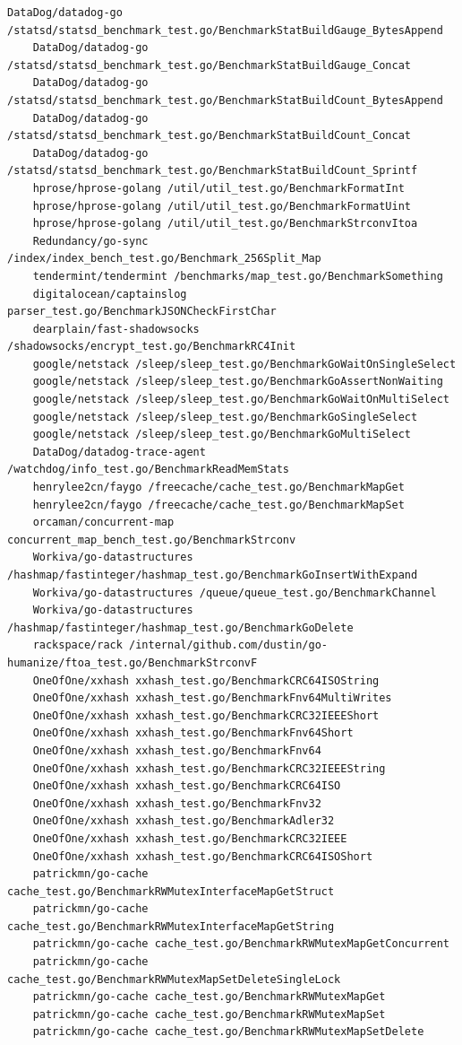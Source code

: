 \documentclass{seal_thesis}
\begin{document}
\begin{lstlisting}[basicstyle=\tiny]
	DataDog/datadog-go /statsd/statsd_benchmark_test.go/BenchmarkStatBuildGauge_BytesAppend
	DataDog/datadog-go /statsd/statsd_benchmark_test.go/BenchmarkStatBuildGauge_Concat
	DataDog/datadog-go /statsd/statsd_benchmark_test.go/BenchmarkStatBuildCount_BytesAppend
	DataDog/datadog-go /statsd/statsd_benchmark_test.go/BenchmarkStatBuildCount_Concat
	DataDog/datadog-go /statsd/statsd_benchmark_test.go/BenchmarkStatBuildCount_Sprintf
	hprose/hprose-golang /util/util_test.go/BenchmarkFormatInt
	hprose/hprose-golang /util/util_test.go/BenchmarkFormatUint
	hprose/hprose-golang /util/util_test.go/BenchmarkStrconvItoa
	Redundancy/go-sync /index/index_bench_test.go/Benchmark_256Split_Map
	tendermint/tendermint /benchmarks/map_test.go/BenchmarkSomething
	digitalocean/captainslog parser_test.go/BenchmarkJSONCheckFirstChar
	dearplain/fast-shadowsocks /shadowsocks/encrypt_test.go/BenchmarkRC4Init
	google/netstack /sleep/sleep_test.go/BenchmarkGoWaitOnSingleSelect
	google/netstack /sleep/sleep_test.go/BenchmarkGoAssertNonWaiting
	google/netstack /sleep/sleep_test.go/BenchmarkGoWaitOnMultiSelect
	google/netstack /sleep/sleep_test.go/BenchmarkGoSingleSelect
	google/netstack /sleep/sleep_test.go/BenchmarkGoMultiSelect
	DataDog/datadog-trace-agent /watchdog/info_test.go/BenchmarkReadMemStats
	henrylee2cn/faygo /freecache/cache_test.go/BenchmarkMapGet
	henrylee2cn/faygo /freecache/cache_test.go/BenchmarkMapSet
	orcaman/concurrent-map concurrent_map_bench_test.go/BenchmarkStrconv
	Workiva/go-datastructures /hashmap/fastinteger/hashmap_test.go/BenchmarkGoInsertWithExpand
	Workiva/go-datastructures /queue/queue_test.go/BenchmarkChannel
	Workiva/go-datastructures /hashmap/fastinteger/hashmap_test.go/BenchmarkGoDelete
	rackspace/rack /internal/github.com/dustin/go-humanize/ftoa_test.go/BenchmarkStrconvF
	OneOfOne/xxhash xxhash_test.go/BenchmarkCRC64ISOString
	OneOfOne/xxhash xxhash_test.go/BenchmarkFnv64MultiWrites
	OneOfOne/xxhash xxhash_test.go/BenchmarkCRC32IEEEShort
	OneOfOne/xxhash xxhash_test.go/BenchmarkFnv64Short
	OneOfOne/xxhash xxhash_test.go/BenchmarkFnv64
	OneOfOne/xxhash xxhash_test.go/BenchmarkCRC32IEEEString
	OneOfOne/xxhash xxhash_test.go/BenchmarkCRC64ISO
	OneOfOne/xxhash xxhash_test.go/BenchmarkFnv32
	OneOfOne/xxhash xxhash_test.go/BenchmarkAdler32
	OneOfOne/xxhash xxhash_test.go/BenchmarkCRC32IEEE
	OneOfOne/xxhash xxhash_test.go/BenchmarkCRC64ISOShort
	patrickmn/go-cache cache_test.go/BenchmarkRWMutexInterfaceMapGetStruct
	patrickmn/go-cache cache_test.go/BenchmarkRWMutexInterfaceMapGetString
	patrickmn/go-cache cache_test.go/BenchmarkRWMutexMapGetConcurrent
	patrickmn/go-cache cache_test.go/BenchmarkRWMutexMapSetDeleteSingleLock
	patrickmn/go-cache cache_test.go/BenchmarkRWMutexMapGet
	patrickmn/go-cache cache_test.go/BenchmarkRWMutexMapSet
	patrickmn/go-cache cache_test.go/BenchmarkRWMutexMapSetDelete
\end{lstlisting}



\backmatter




\end{document}

